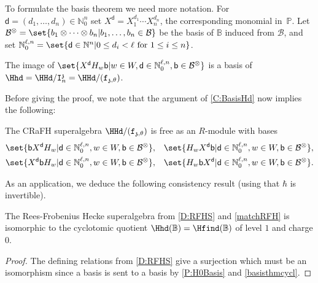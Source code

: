 \documentclass[a4paper,11pt]{amsart}
\newcommand\cB{\mathcal{B}}
\newcommand\cBo{\cB^{\otimes}}
\numberwithin{equation}{subsection}
\theoremstyle{definition}
\theoremstyle{theorem}
\theoremstyle{remark}
\newcommand\charge{{\mathfrak{z}}}
\newcommand\Ic[1][n]{\mathtt{I}^\charge_{#1}}
\newcommand\fct{\mathtt{f}_{\charge,\theta}}
\newcommand\Sym{W}
\newcommand\bd{\mathsf{d}}
\newcommand\bb{\mathsf{b}}
\newcommand\Poo{\mathbb{P}}
\newcommand\N{\mathbb{N}}
\newcommand{\Bo}{\mathbb{B}}
\begin{document}
To formulate the basis theorem we need more notation. For  $\bd=(d_1,\ldots,d_n)
\in\mathbb{N}_0^n$ set  $X^\bd=X_1^{d_1}\cdots X_n^{d_n}$, the corresponding monomial in~$\Poo$.
 Let $\cBo=\set{b_1\otimes\dots\otimes b_n|b_1,\dots,b_n\in\cB}$ be the basis of $\Bo$ induced from $\cB$, and set
 $\N^{\ell,n}_0=\set{\bd\in\N^n|0\le d_i<\ell\text{ for }1\le i\le n}$.

  \begin{Theorem}\label{basisthmcycl}
    The  image of $\set{X^\bd H_w\bb|w\in\Sym, \bd\in\N^{\ell,n}_0, \bb\in\cBo}$ is a basis of $\Hhd=\HHd/\Ic=\HHd/(\fct)$.
  \end{Theorem}

Before giving the proof, we note that the argument of \autoref{C:BasisHd} now implies the following:

\begin{Corollary}\label{C:HdBasis}
  The CRaFH superalgebra $\HHd/(\fct)$ is free as an $R$-module with bases
  \begin{align*}
        &\set{\bb X^\bd H_w| \bd\in\N^{\ell,n}_0, w\in\Sym, \bb\in\cBo},
        &\set{H_w X^\bd \bb| \bd\in\N^{\ell,n}_0, w\in\Sym, \bb\in\cBo},\\
        &\set{ X^\bd  \bb H_w| \bd\in\N^{\ell,n}_0, w\in\Sym, \bb\in\cBo},
        &\set{H_w \bb X^\bd | \bd\in\N^{\ell,n}_0, w\in\Sym, \bb\in\cBo}.
  \end{align*}
\end{Corollary}


As an application, we deduce the following consistency result (using that $\hbar$ is invertible).

\begin{Corollary} \label{notationclash} The Rees-Frobenius Hecke superalgebra from \autoref{D:RFHS} and \autoref{matchRFH} is isomorphic to the cyclotomic quotient $\Hhd(\Bo)=\Hfind(\Bo)$ of level $1$ and charge $0$.
\end{Corollary}
\begin{proof}The defining relations from \autoref{D:RFHS} give a surjection which must be an isomorphism since a basis is sent to a basis by  \autoref {P:H0Basis} and \autoref{basisthmcycl}.
\end{proof}
\end{document}

